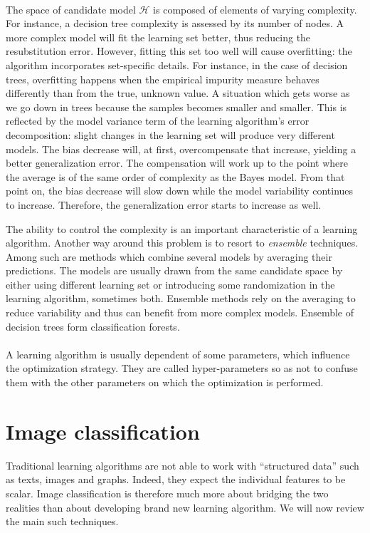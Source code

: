 \documentclass[a4paper]{report}
\begin{document}
\paragraph{}
The space of candidate model $\mathcal{H}$ is composed of elements of varying complexity. For instance, a decision tree complexity is assessed by its number of nodes. A more complex model will fit the learning set better, thus reducing the resubstitution error. However, fitting this set too well will cause overfitting: the algorithm incorporates set-specific details. For instance, in the case of decision trees, overfitting happens when the empirical impurity measure behaves differently than from the true, unknown value. A situation which gets worse as we go down in trees because the samples becomes smaller and smaller. This is reflected by the model variance term of the learning algorithm's error decomposition: slight changes in the learning set will produce very different models. The bias decrease will, at first, overcompensate that increase, yielding a better generalization error. The compensation will work up to the point where the average is of the same order of complexity as the Bayes model. From that point on, the bias decrease will slow down while the model variability continues to increase. Therefore, the generalization error starts to increase as well.
\par
The ability to control the complexity is an important characteristic of a learning algorithm. Another way around this problem is to resort to \textit{ensemble} techniques. Among such are methods which combine several models by averaging their predictions. The models are usually drawn from the same candidate space by either using different learning set or introducing some randomization in the learning algorithm, sometimes both. Ensemble methods rely on the averaging to reduce variability and thus can benefit from more complex models. Ensemble of decision trees form classification forests.
\paragraph{}
A learning algorithm is usually dependent of some parameters, which influence the optimization strategy. They are called hyper-parameters so as not to confuse them with the other parameters on which the optimization is performed.

\section{Image classification}
Traditional learning algorithms are not able to work with ``structured data'' such as texts, images and graphs. Indeed, they expect the individual features to be scalar. Image classification is therefore much more about bridging the two realities than about developing brand new learning algorithm. We will now review the main such techniques.
\end{document}
